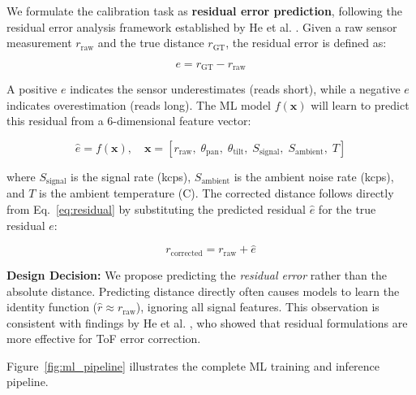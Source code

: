 \documentclass[12pt,a4paper]{article}
\begin{document}
    We formulate the calibration task as \textbf{residual error prediction}, following the residual error analysis framework established by He et al. \cite{he2017depth}. Given a raw sensor measurement $r_{\text{raw}}$ and the true distance $r_{\text{GT}}$, the residual error is defined as:

    \begin{equation}
        e = r_{\text{GT}} - r_{\text{raw}}
        \label{eq:residual}
    \end{equation}

    A positive $e$ indicates the sensor underestimates (reads short), while a negative $e$ indicates overestimation (reads long). The ML model $f(\mathbf{x})$ will learn to predict this residual from a 6-dimensional feature vector:

    \begin{equation}
        \hat{e} = f(\mathbf{x}), \quad \mathbf{x} = [r_{\text{raw}},\; \theta_{\text{pan}},\; \theta_{\text{tilt}},\; S_{\text{signal}},\; S_{\text{ambient}},\; T]
        \label{eq:feature_vector}
    \end{equation}

    where $S_{\text{signal}}$ is the signal rate (kcps), $S_{\text{ambient}}$ is the ambient noise rate (kcps), and $T$ is the ambient temperature (\textdegree C). The corrected distance follows directly from Eq.~\ref{eq:residual} by substituting the predicted residual $\hat{e}$ for the true residual $e$:

    \begin{equation}
        r_{\text{corrected}} = r_{\text{raw}} + \hat{e}
        \label{eq:correction}
    \end{equation}

    \textbf{Design Decision:} We propose predicting the \textit{residual error} rather than the absolute distance. Predicting distance directly often causes models to learn the identity function ($\hat{r} \approx r_{\text{raw}}$), ignoring all signal features. This observation is consistent with findings by He et al. \cite{he2017depth}, who showed that residual formulations are more effective for ToF error correction.

    Figure~\ref{fig:ml_pipeline} illustrates the complete ML training and inference pipeline.
\end{document}
